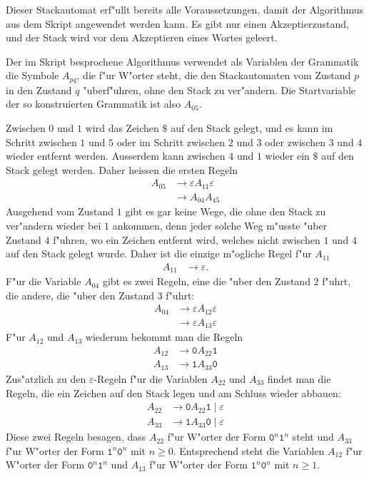 \begin{loesung}
Dieser Stackautomat erf"ullt bereits alle Voraussetzungen, damit
der Algorithmus aus dem Skript angewendet werden kann. Es gibt nur
einen Akzeptierzustand, und der Stack wird vor dem Akzeptieren
eines Wortes geleert.

Der im Skript besprochene Algorithmus verwendet als Variablen der
Grammatik die Symbole $A_{pq}$, die f"ur W"orter steht, die den
Stackautomaten vom Zustand $p$ in den Zustand $q$ "uberf"uhren, ohne
den Stack zu ver"andern. Die Startvariable der so konstruierten Grammatik
ist also $A_{05}$.

Zwischen $0$ und $1$ wird das Zeichen $\texttt{\$}$ auf den Stack gelegt,
und es kann im Schritt zwischen $1$ und $5$ oder im Schritt zwischen $2$
und $3$ oder zwischen $3$ und $4$ wieder entfernt werden. Ausserdem
kann zwischen $4$ und $1$ wieder ein $\texttt{\$}$ auf den Stack gelegt
werden. Daher heissen die ersten Regeln
\begin{align*}
A_{05}&\to \varepsilon A_{11}\varepsilon \\
      &\to A_{04}A_{45}
\end{align*}
Ausgehend vom Zustand $1$ gibt es gar keine Wege, die ohne den Stack zu
ver"andern wieder bei $1$ ankommen, denn jeder solche Weg m"usste "uber
Zustand $4$ f"uhren, wo ein Zeichen entfernt wird, welches nicht zwischen
$1$ und $4$ auf den Stack gelegt wurde. Daher ist die einzige m"ogliche
Regel f"ur $A_{11}$
\begin{align*}
A_{11}&\to\varepsilon.
\end{align*}
F"ur die Variable $A_{04}$ gibt es zwei Regeln, eine die "uber den
Zustand $2$ f"uhrt, die andere, die "uber den Zustand $3$ f"uhrt:
\begin{align*}
A_{04}&\to \varepsilon A_{12}\varepsilon\\
      &\to \varepsilon A_{13}\varepsilon
\end{align*}
F"ur $A_{12}$ und $A_{13}$ wiederum bekommt man die Regeln
\begin{align*}
A_{12}&\to\texttt{0} A_{22}\texttt{1}\\
A_{13}&\to\texttt{1} A_{33}\texttt{0}
\end{align*}
Zus"atzlich zu den $\varepsilon$-Regeln f"ur die Variablen $A_{22}$ und $A_{33}$
findet man die Regeln, die ein Zeichen auf den Stack legen und am
Schluss wieder abbauen:
\begin{align*}
A_{22}&\to \texttt{0}A_{22}\texttt{1}\;|\;\varepsilon\\
A_{33}&\to \texttt{1}A_{33}\texttt{0}\;|\;\varepsilon
\end{align*}
Diese zwei Regeln besagen, dass $A_{22}$ f"ur W"orter der Form
$\texttt{0}^n\texttt{1}^n$ steht und $A_{33}$ f"ur W"orter der Form
$\texttt{1}^n\texttt{0}^n$ mit $n\ge 0$.
Entsprechend steht die Variablen $A_{12}$  f"ur W"orter der Form
$\texttt{0}^n\texttt{1}^n$ und $A_{13}$ f"ur W"orter der Form
$\texttt{1}^n\texttt{0}^n$ mit $n\ge 1$.


\end{loesung}
